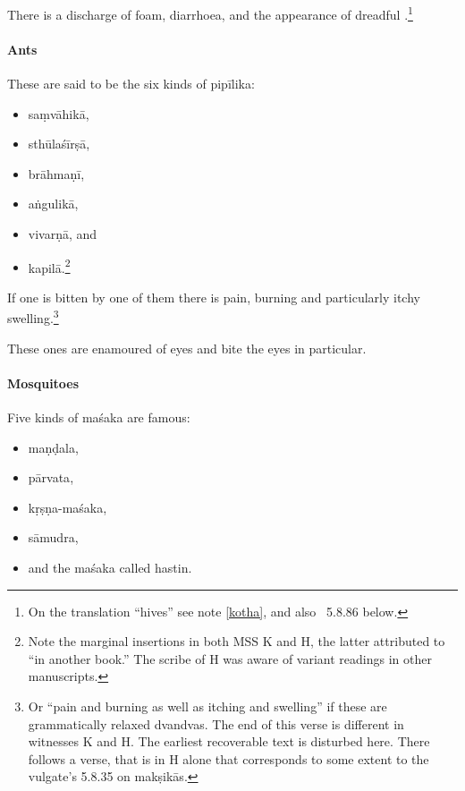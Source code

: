 \begin{translation}
There is a discharge of foam, diarrhoea, and the appearance of 
dreadful .\footnote{On the translation “hives” see
    note \ref{kotha}, and also \SS\ 5.8.86 below.} 
    
    \paragraph{Ants}
    
    These are said to be the six kinds of \gls{pipīlika}: 
    \begin{itemize}
        \item \Gls{saṃvāhikā}, 
        \item \Gls{sthūlaśīrṣā}, 
        \item \Gls{brāhmaṇī}, 
        \item \Gls{aṅgulikā},
        \item \Gls{vivarṇā}, and 
        \item \Gls{kapilā}.\footnote{Note the marginal insertions in both
            MSS K and H, the latter attributed to  “in another
            book.” The scribe of H was aware of variant readings in other
            manuscripts. }    
    \end{itemize}
If one is bitten by one of them there is pain, burning and particularly 
itchy swelling.\footnote{Or “pain and burning as well as itching
        and swelling” if these are grammatically relaxed dvandvas. The end of
        this verse is different in witnesses K and H.  The earliest
        recoverable text is disturbed here.  There follows a verse, 
         that is in H alone that corresponds to some extent to 
        the vulgate's 5.8.35 on \glspl{makṣikā}.}
        
These ones are enamoured of eyes and bite the eyes in particular.
    
    \paragraph{Mosquitoes}
    
\item[36 verses 1--3]

Five kinds of \gls{maśaka} are famous:
\begin{itemize}
    \item \Gls{maṇḍala},
    \item \Gls{pārvata},
    \item \Gls{kṛṣṇa-maśaka},
    \item \Gls{sāmudra}, 
    \item and the \gls{maśaka} called \Gls{hastin}.
\end{itemize}


\end{translation}
